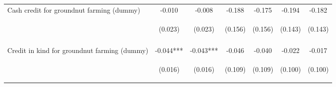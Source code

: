 \begin{center}
\begin{tabular}{lcccccc}
Cash credit for groundnut farming (dummy) & -0.010 & -0.008 & -0.188 & -0.175 & -0.194 & -0.182 \\
 & \begin{footnotesize}(0.023)\end{footnotesize} & \begin{footnotesize}(0.023)\end{footnotesize} & \begin{footnotesize}(0.156)\end{footnotesize} & \begin{footnotesize}(0.156)\end{footnotesize} & \begin{footnotesize}(0.143)\end{footnotesize} & \begin{footnotesize}(0.143)\end{footnotesize} \\
\vspace{4pt} & \begin{footnotesize}[0.659]\end{footnotesize} & \begin{footnotesize}[0.729]\end{footnotesize} & \begin{footnotesize}[0.229]\end{footnotesize} & \begin{footnotesize}[0.261]\end{footnotesize} & \begin{footnotesize}[0.176]\end{footnotesize} & \begin{footnotesize}[0.202]\end{footnotesize} \\
Credit in kind for groundnut farming (dummy) & -0.044*** & -0.043*** & -0.046 & -0.040 & -0.022 & -0.017 \\
 & \begin{footnotesize}(0.016)\end{footnotesize} & \begin{footnotesize}(0.016)\end{footnotesize} & \begin{footnotesize}(0.109)\end{footnotesize} & \begin{footnotesize}(0.109)\end{footnotesize} & \begin{footnotesize}(0.100)\end{footnotesize} & \begin{footnotesize}(0.100)\end{footnotesize} \\

\end{tabular}
\end{center}
